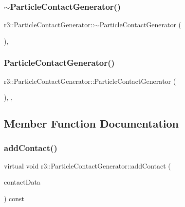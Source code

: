 \subsubsection{\texorpdfstring{$\sim$\+Particle\+Contact\+Generator()}{~ParticleContactGenerator()}}
{\footnotesize\ttfamily r3\+::\+Particle\+Contact\+Generator\+::$\sim$\+Particle\+Contact\+Generator (\begin{DoxyParamCaption}{ }\end{DoxyParamCaption})\hspace{0.3cm}{\ttfamily [virtual]}, {\ttfamily [default]}}

\mbox{\label{classr3_1_1_particle_contact_generator_a3cfeb03fe6fb6a82a64746c0dd9b89f2}} 
\subsubsection{\texorpdfstring{Particle\+Contact\+Generator()}{ParticleContactGenerator()}}
{\footnotesize\ttfamily r3\+::\+Particle\+Contact\+Generator\+::\+Particle\+Contact\+Generator (\begin{DoxyParamCaption}{ }\end{DoxyParamCaption})\hspace{0.3cm}{\ttfamily [explicit]}, {\ttfamily [protected]}, {\ttfamily [default]}}



\subsection{Member Function Documentation}
\mbox{\label{classr3_1_1_particle_contact_generator_a39a7a8f0d5b31b1ca2c2ace2af8e2978}} 
\subsubsection{\texorpdfstring{add\+Contact()}{addContact()}}
{\footnotesize\ttfamily virtual void r3\+::\+Particle\+Contact\+Generator\+::add\+Contact (\begin{DoxyParamCaption}\item[{\mbox{\hyperlink{classr3_1_1_fixed_size_container}{Fixed\+Size\+Container}}$<$ \mbox{\hyperlink{classr3_1_1_particle_contact}{Particle\+Contact}} $>$ \&}]{contact\+Data }\end{DoxyParamCaption}) const\hspace{0.3cm}{\ttfamily [pure virtual]}}



